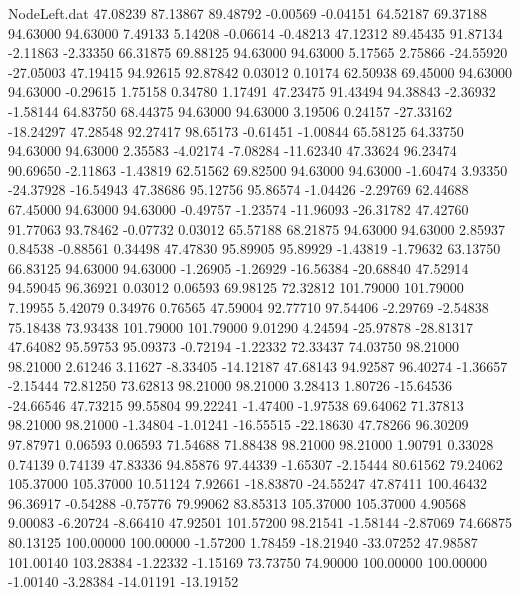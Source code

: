 \begin{filecontents}{NodeLeft.dat}
  47.08239   87.13867   89.48792    -0.00569   -0.04151   64.52187   69.37188   94.63000   94.63000    7.49133    5.14208   -0.06614   -0.48213
  47.12312   89.45435   91.87134    -2.11863   -2.33350   66.31875   69.88125   94.63000   94.63000    5.17565    2.75866  -24.55920  -27.05003
  47.19415   94.92615   92.87842     0.03012    0.10174   62.50938   69.45000   94.63000   94.63000   -0.29615    1.75158    0.34780    1.17491
  47.23475   91.43494   94.38843    -2.36932   -1.58144   64.83750   68.44375   94.63000   94.63000    3.19506    0.24157  -27.33162  -18.24297
  47.28548   92.27417   98.65173    -0.61451   -1.00844   65.58125   64.33750   94.63000   94.63000    2.35583   -4.02174   -7.08284  -11.62340
  47.33624   96.23474   90.69650    -2.11863   -1.43819   62.51562   69.82500   94.63000   94.63000   -1.60474    3.93350  -24.37928  -16.54943
  47.38686   95.12756   95.86574    -1.04426   -2.29769   62.44688   67.45000   94.63000   94.63000   -0.49757   -1.23574  -11.96093  -26.31782
  47.42760   91.77063   93.78462    -0.07732    0.03012   65.57188   68.21875   94.63000   94.63000    2.85937    0.84538   -0.88561    0.34498
  47.47830   95.89905   95.89929    -1.43819   -1.79632   63.13750   66.83125   94.63000   94.63000   -1.26905   -1.26929  -16.56384  -20.68840
  47.52914   94.59045   96.36921     0.03012    0.06593   69.98125   72.32812  101.79000  101.79000    7.19955    5.42079    0.34976    0.76565
  47.59004   92.77710   97.54406    -2.29769   -2.54838   75.18438   73.93438  101.79000  101.79000    9.01290    4.24594  -25.97878  -28.81317
  47.64082   95.59753   95.09373    -0.72194   -1.22332   72.33437   74.03750   98.21000   98.21000    2.61246    3.11627   -8.33405  -14.12187
  47.68143   94.92587   96.40274    -1.36657   -2.15444   72.81250   73.62813   98.21000   98.21000    3.28413    1.80726  -15.64536  -24.66546
  47.73215   99.55804   99.22241    -1.47400   -1.97538   69.64062   71.37813   98.21000   98.21000   -1.34804   -1.01241  -16.55515  -22.18630
  47.78266   96.30209   97.87971     0.06593    0.06593   71.54688   71.88438   98.21000   98.21000    1.90791    0.33028    0.74139    0.74139
  47.83336   94.85876   97.44339    -1.65307   -2.15444   80.61562   79.24062  105.37000  105.37000   10.51124    7.92661  -18.83870  -24.55247
  47.87411  100.46432   96.36917    -0.54288   -0.75776   79.99062   83.85313  105.37000  105.37000    4.90568    9.00083   -6.20724   -8.66410
  47.92501  101.57200   98.21541    -1.58144   -2.87069   74.66875   80.13125  100.00000  100.00000   -1.57200    1.78459  -18.21940  -33.07252
  47.98587  101.00140  103.28384    -1.22332   -1.15169   73.73750   74.90000  100.00000  100.00000   -1.00140   -3.28384  -14.01191  -13.19152

\end{filecontents}
